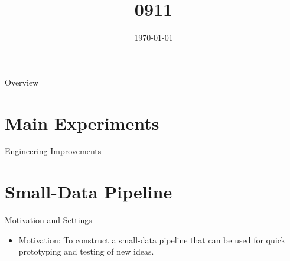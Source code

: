 \documentclass[aspectratio=169,xcolor=dvipsnames]{beamer}
\title{0911}
\date{\today} %
\begin{document}
\begin{frame}
    \titlepage
\end{frame}

\begin{frame}{Overview}
    \tableofcontents
\end{frame}

\section{Main Experiments}

\begin{frame}[allowframebreaks]{Engineering Improvements}
    
\end{frame}


\section{Small-Data Pipeline}


\begin{frame}[allowframebreaks]{Motivation and Settings}
    \begin{itemize}
        \item Motivation: To construct a small-data pipeline that can be used for quick prototyping and testing of new ideas.
    \end{itemize}
    
\end{frame}
\end{document}
